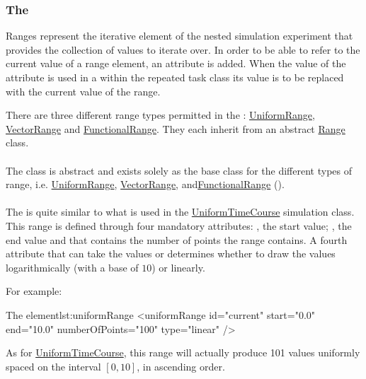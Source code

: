 \subsubsection{The }
\label{sec:ranges}
Ranges represent the iterative element of the nested simulation experiment that provides the collection of values to iterate over. In order to be able to refer to the current value of a range element, an  attribute is added. When the value of the  attribute is used in a  within the repeated task class its value is to be replaced with the current value of the range.

There are three different range types permitted in the : \hyperref[class:uniformRange]{UniformRange}, \hyperref[class:vectorRange]{VectorRange} and \hyperref[class:functionalRange]{FunctionalRange}.
They each inherit from an abstract \hyperref[class:range]{Range} class.

\paragraph{}
\label{class:range}
The  class is abstract and exists solely as the base class for the different types of range, i.e. \hyperref[class:uniformRange]{UniformRange}, \hyperref[class:vectorRange]{VectorRange}, and\hyperref[class:functionalRange]{FunctionalRange} (). 


\paragraph{}
\label{class:uniformRange}
The  is quite similar to what is used in the \hyperref[class:uniformTimeCourse]{UniformTimeCourse} simulation class. This range is defined through four mandatory attributes: , the start value; , the end value and  that contains the number of points the range contains. A fourth attribute  that can take the values  or  determines whether to draw the values logarithmically (with a base of $10$) or linearly.

For example:
\begin{myXmlLst}{The  element}{lst:uniformRange}
<uniformRange id="current" start="0.0" end="10.0" numberOfPoints="100" type="linear" /> 
\end{myXmlLst}
As for \hyperref[class:uniformTimeCourse]{UniformTimeCourse}, this range will actually produce 101 values uniformly spaced on the interval $[0, 10]$, in ascending order.

